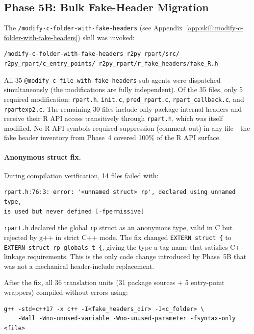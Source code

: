 \documentclass[12pt]{article}
\newcommand{\skillapp}[2]{\texttt{/#1} (see Appendix~\ref{app:skill:#2})}
\begin{document}
\subsection{Phase 5B: Bulk Fake-Header Migration}

The \skillapp{modify-c-folder-with-fake-headers}{modify-c-folder-with-fake-headers} skill was invoked:
\begin{lstlisting}[style=skill]
/modify-c-folder-with-fake-headers r2py_rpart/src/ r2py_rpart/c_entry_points/ r2py_rpart/r_fake_headers/fake_R.h
\end{lstlisting}

All 35 \texttt{@modify-c-file-with-fake-headers} sub-agents were dispatched simultaneously (the modifications are fully independent). Of the 35 files, only 5 required modification: \texttt{rpart.h}, \texttt{init.c}, \texttt{pred\_rpart.c}, \texttt{rpart\_callback.c}, and \texttt{rpartexp2.c}. The remaining 30 files include only package-internal headers and receive their R API access transitively through \texttt{rpart.h}, which was itself modified. No R API symbols required suppression (comment-out) in any file---the fake header inventory from Phase~4 covered 100\% of the R API surface.

\paragraph{Anonymous struct fix.} During compilation verification, 14 files failed with:
\begin{lstlisting}[style=bash]
rpart.h:76:3: error: '<unnamed struct> rp', declared using unnamed type,
is used but never defined [-fpermissive]
\end{lstlisting}

\texttt{rpart.h} declared the global \texttt{rp} struct as an anonymous type, valid in C but rejected by g++ in strict C++ mode. The fix changed \texttt{EXTERN struct \{} to \texttt{EXTERN struct rp\_globals\_t \{}, giving the type a tag name that satisfies C++ linkage requirements. This is the only code change introduced by Phase~5B that was not a mechanical header-include replacement.

After the fix, all 36 translation units (31 package sources + 5 entry-point wrappers) compiled without errors using:
\begin{lstlisting}[style=bash]
g++ -std=c++17 -x c++ -I<fake_headers_dir> -I<c_folder> \
    -Wall -Wno-unused-variable -Wno-unused-parameter -fsyntax-only <file>
\end{lstlisting}
\end{document}
